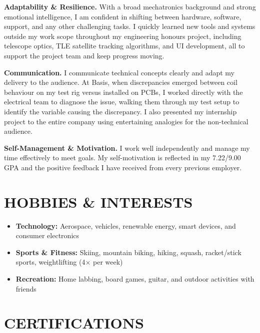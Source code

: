 \documentclass[11pt, a4paper]{article}
\begin{document}
\vspace{4pt}
\textbf{Adaptability \& Resilience.}\enspace
With a broad mechatronics background and strong emotional intelligence, I am confident in
shifting between hardware, software, support, and any other challenging tasks. I quickly
learned new tools and systems outside my work scope throughout my engineering honours
project, including telescope optics, TLE satellite tracking algorithms, and UI development,
all to support the project team and keep progress moving.

\vspace{4pt}
\textbf{Communication.}\enspace
I communicate technical concepts clearly and adapt my delivery to the audience. At Basis,
when discrepancies emerged between coil behaviour on my test rig versus installed on PCBs,
I worked directly with the electrical team to diagnose the issue, walking them through my
test setup to identify the variable causing the discrepancy. I also presented my internship
project to the entire company using entertaining analogies for the non-technical audience.

\vspace{4pt}
\textbf{Self-Management \& Motivation.}\enspace
I work well independently and manage my time effectively to meet goals. My self-motivation
is reflected in my 7.22/9.00 GPA and the positive feedback I have received from every
previous employer.

\section{HOBBIES \& INTERESTS}

\begin{itemize}
  \item \textbf{Technology:} Aerospace, vehicles, renewable energy, smart devices, and
        consumer electronics
  \item \textbf{Sports \& Fitness:} Skiing, mountain biking, hiking, squash,
        racket/stick sports, weightlifting (4$\times$ per week)
  \item \textbf{Recreation:} Home labbing, board games, guitar, and outdoor activities
        with friends
\end{itemize}

\section{CERTIFICATIONS}
\end{document}

